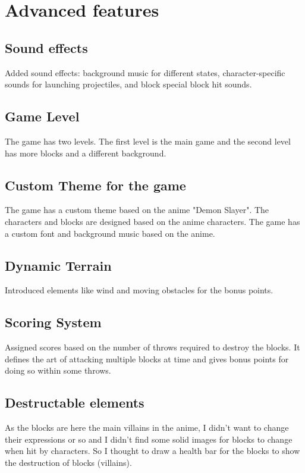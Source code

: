 \documentclass[12pt]{article}
\begin{document}
\section{Advanced features}
\subsection{Sound effects}
Added sound effects: background music for different states, character-specific sounds for launching projectiles, and block special block hit sounds.

\subsection{Game Level}
The game has two levels. The first level is the main game and the second level has more blocks and a different background.

\subsection{Custom Theme for the game}
The game has a custom theme based on the anime "Demon Slayer". The characters and blocks are designed based on the anime characters. The game has a custom font and background music based on the anime.

\subsection{Dynamic Terrain}
Introduced elements like wind and moving obstacles for the bonus points.

\subsection{Scoring System}
Assigned scores based on the number of throws required to destroy the blocks. It defines the art of attacking multiple blocks at time and gives bonus points for doing so within some throws.

\subsection{Destructable elements}
As the blocks are here the main villains in the anime, I didn't want to change their expressions or so and I didn't find some solid images for blocks to change when hit by characters.
So I thought to draw a health bar for the blocks to show the destruction of blocks (villains).
\end{document}

